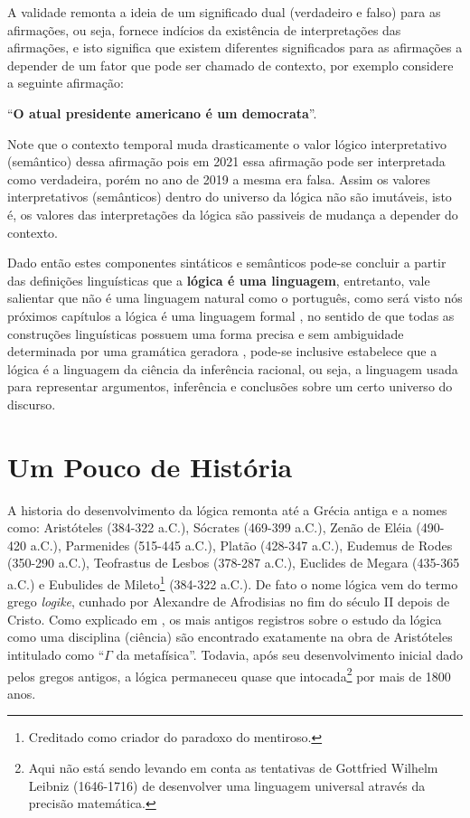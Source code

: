 A validade remonta a ideia de um significado dual (verdadeiro e falso) para as afirmações, ou seja, fornece indícios da existência de interpretações das afirmações, e isto significa que existem diferentes significados para as afirmações a depender de um fator que pode ser chamado de contexto, por exemplo considere a seguinte afirmação: 

\begin{center}
	``\textbf{O atual presidente americano é um democrata}''.
\end{center}

Note que o contexto temporal muda drasticamente o valor lógico interpretativo (semântico) dessa afirmação pois em 2021 essa afirmação pode ser interpretada como verdadeira, porém no ano de 2019 a mesma era falsa. Assim os valores interpretativos (semânticos) dentro do universo da lógica não são imutáveis, isto é, os valores das interpretações da lógica são passiveis de mudança a depender do contexto.

Dado então estes componentes sintáticos e semânticos pode-se concluir a partir das definições linguísticas que a \textbf{lógica é uma linguagem}, entretanto, vale salientar que não é uma linguagem natural como o português, como será visto nós próximos capítulos a lógica é uma linguagem formal \cite{benjaLivro2010}, no sentido de que todas as construções linguísticas possuem uma forma precisa e sem ambiguidade determinada por uma gramática geradora \cite{hopcroft2008, linz2006},  pode-se inclusive estabelece que a lógica é a linguagem da ciência da inferência racional, ou seja, a linguagem usada para representar argumentos, inferência e conclusões sobre um certo universo do discurso.

\section{Um Pouco de História}\label{sec:Um-pouco-historia}

A historia do desenvolvimento da lógica remonta até a Grécia antiga e a nomes como: Aristóteles (384-322 a.C.), Sócrates (469-399 a.C.), Zenão de Eléia (490-420 a.C.), Parmenides (515-445 a.C.), Platão (428-347 a.C.), Eudemus de Rodes (350-290 a.C.), Teofrastus de Lesbos (378-287 a.C.), Euclides de Megara (435-365 a.C.) e  Eubulides de Mileto\footnote{Creditado como criador do paradoxo do mentiroso.} (384-322 a.C.). De fato o nome lógica vem do termo grego \textit{logike}, cunhado por Alexandre de Afrodisias no fim do século II depois de Cristo. Como explicado em \cite{abe2002-logica}, os mais antigos registros sobre o estudo da lógica como uma disciplina (ciência) são encontrado exatamente na obra de Aristóteles intitulado como ``$\Gamma$ da metafísica''. Todavia, após seu desenvolvimento inicial dado pelos gregos antigos, a lógica permaneceu quase que intocada\footnote{Aqui não está sendo levando em conta as tentativas de Gottfried Wilhelm Leibniz (1646-1716) de desenvolver uma linguagem universal através da precisão matemática.} por mais de 1800 anos.

